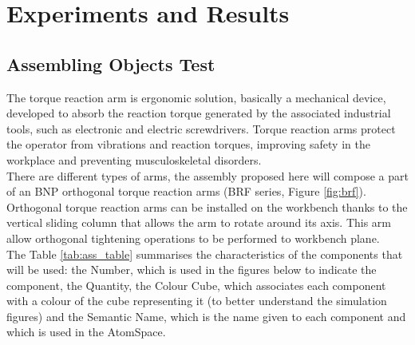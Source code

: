 
\chapter{Experiments and Results} \label{cha:test}

\section{Assembling Objects Test}\label{sec:ass_objs_test}

The torque reaction arm is ergonomic solution, basically a mechanical device, developed to absorb the reaction torque generated by the associated industrial tools, such as electronic and electric screwdrivers.
Torque reaction arms protect the operator from vibrations and reaction torques, improving safety in the workplace and preventing musculoskeletal disorders. \\
There are different types of arms, the assembly proposed here will compose a part of an BNP orthogonal torque reaction arms (BRF series, Figure \ref{fig:brf}). \\
Orthogonal torque reaction arms can be installed on the workbench thanks to the vertical sliding column that allows the arm to rotate around its axis. 
This arm allow orthogonal tightening operations to be performed to workbench plane. \\

The Table \ref{tab:ass_table} summarises the characteristics of the components that will be used: the Number, which is used in the figures below to indicate the component, the Quantity, the Colour Cube, which associates each component with a colour of the cube representing it (to better understand the simulation figures) and the Semantic Name, which is the name given to each component and which is used in the AtomSpace.

